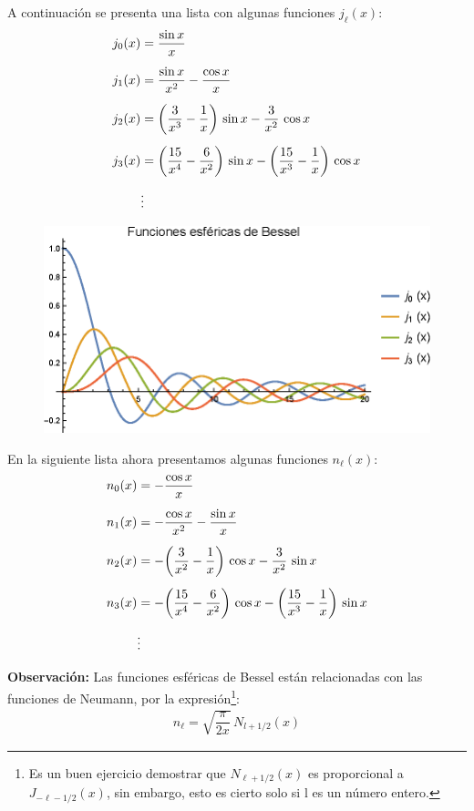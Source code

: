 A continuación se presenta una lista con algunas funciones $j_{\ell} (x)$:
\begin{align*}
j_{0} (x) &= \dfrac{\sin x}{x} \\[0.5em]
j_{1} (x) &= \dfrac{\sin x}{x^{2}} - \dfrac{\cos x}{x} \\[0.5em]
j_{2} (x) &= \bigg( \dfrac{3}{x^{3}} - \dfrac{1}{x} \bigg) \, \sin x - \dfrac{3}{x^{2}} \, \cos x \\[0.5em]
j_{3} (x) &= \bigg( \dfrac{15}{x^{4}} - \dfrac{6}{x^{2}} \bigg) \, \sin x - \bigg( \dfrac{15}{x^{3}} - \dfrac{1}{x} \bigg) \, \cos x \\[0.5em]
\hspace{0.4cm} &\vdots
\end{align*}
\begin{figure}[H]
    \centering
    \includegraphics[scale=1]{Imagenes/Plot_Esfericas_Bessel.eps}
\end{figure}

En la siguiente lista ahora presentamos algunas funciones $n_{\ell} (x)$:
\begin{align*}
n_{0} (x) &= - \dfrac{\cos x}{x} \\[0.5em]
n_{1} (x) &= - \dfrac{\cos x}{x^{2}} - \dfrac{\sin x}{x} \\[0.5em]
n_{2} (x) &= - \bigg( \dfrac{3}{x^{2}} - \dfrac{1}{x} \bigg) \, \cos x - \dfrac{3}{x^{2}} \, \sin x \\[0.5em]
n_{3} (x) &= - \bigg( \dfrac{15}{x^{4}} - \dfrac{6}{x^{2}} \bigg) \, \cos x - \bigg( \dfrac{15}{x^{3}} - \dfrac{1}{x} \bigg) \, \sin x \\[0.5em]
\hspace{0.4cm} &\vdots
\end{align*}

\textbf{Observación:} Las funciones esféricas de Bessel están relacionadas con las funciones de Neumann, por la expresión\footnote{Es un buen ejercicio demostrar que $N_{\ell+1/2} (x)$ es proporcional a $J_{-\ell-1/2} (x)$, sin embargo, esto es cierto solo si l es un número entero.}:
\begin{align*}
n_{\ell} = \sqrt{\dfrac{\pi}{2 x}} \, N_{l+1/2} (x)
\end{align*}

